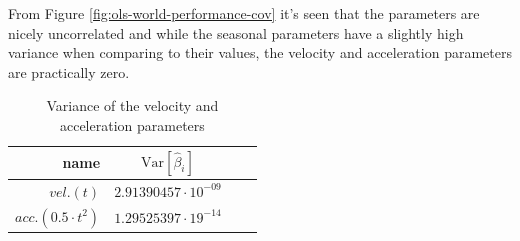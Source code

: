 From Figure \ref{fig:ols-world-performance-cov} it's seen that the parameters are nicely uncorrelated and while the seasonal parameters have a slightly high variance when comparing to their values, the velocity and acceleration parameters are practically zero.
\begin{table}[H]
\centering
\begin{tabular}{r|c c c}
	name & $\mathrm{Var}[\hat{\beta}_i]$ \\ \hline
	$vel. (t)$ & $2.91390457 \cdot 10^{-09}$  \\
	$acc. (0.5 \cdot t^2)$ & $1.29525397 \cdot 19^{-14}$
\end{tabular}
\caption{Variance of the velocity and acceleration parameters}
\end{table}
